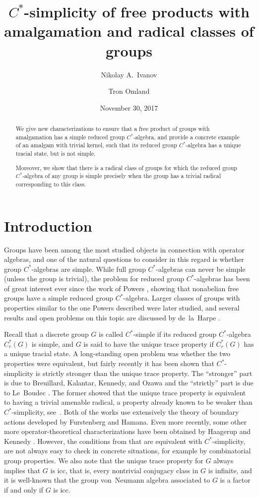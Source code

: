 \documentclass[a4paper]{amsart}
\title[$C^*$-simplicity, amalgams, and radical classes]{$C^*$-simplicity of free products with amalgamation and radical classes of groups}
\author{Nikolay A.\ Ivanov}
\author{Tron Omland}
\date{November 30, 2017}
\theoremstyle{plain}
\theoremstyle{definition}
\theoremstyle{remark}
\numberwithin{theorem}{section}
\begin{document}
\begin{abstract}
We give new characterizations to ensure that a free product of groups with amalgamation has a simple reduced group $C^*$-algebra,
and provide a concrete example of an amalgam with trivial kernel,
such that its reduced group $C^*$-algebra has a unique tracial state, but is not simple.

Moreover, we show that there is a radical class of groups
for which the reduced group $C^*$-algebra of any group is simple
precisely when the group has a trivial radical corresponding to this class.
\end{abstract}

\maketitle

\section{Introduction}

Groups have been among the most studied objects in connection with operator algebras,
and one of the natural questions to consider in this regard is whether group $C^*$-algebras are simple.
While full group $C^*$-algebras can never be simple (unless the group is trivial),
the problem for reduced group $C^*$-algebras has been of great interest ever since the work of Powers \cite{Powers},
showing that nonabelian free groups have a simple reduced group $C^*$-algebra.
Larger classes of groups with properties similar to the one Powers described were later studied,
and several results and open problems on this topic are discussed by de~la~Harpe \cite{Harpe2}.

Recall that a discrete group $G$ is called $C^*$-simple if its reduced group $C^*$-algebra $C^*_r(G)$ is simple,
and $G$ is said to have the unique trace property if $C^*_r(G)$ has a unique tracial state.
A long-standing open problem was whether the two properties were equivalent,
but fairly recently it has been shown that $C^*$-simplicity is strictly stronger than the unique trace property.
The ``stronger'' part is due to Breuillard, Kalantar, Kennedy, and Ozawa \cite{BKKO,KK}
and the ``strictly'' part is due to Le~Boudec \cite{Boudec}.
The former showed that the unique trace property is equivalent to having a trivial amenable radical,
a property already known to be weaker than $C^*$-simplicity, see~\cite{Harpe2}.
Both of the works \cite{BKKO,KK} use extensively the theory of boundary actions developed by Furstenberg and Hamana.
Even more recently,
some other more operator-theoretical characterizations have been obtained by Haagerup \cite{Haagerup} and Kennedy \cite{Kennedy}.
However, the conditions from \cite{Haagerup,Kennedy} that are equivalent with $C^*$-simplicity,
are not always easy to check in concrete situations, for example by combinatorial group properties.
We also note that the unique trace property for $G$ always implies that $G$ is icc,
that is, every nontrivial conjugacy class in $G$ is infinite,
and it is well-known that the group von~Neumann algebra associated to $G$ is a factor if and only if $G$ is icc.
\end{document}
